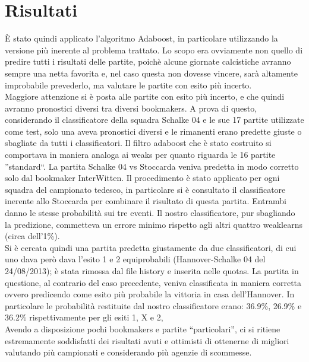 \section{Risultati}

\`E stato quindi applicato l'algoritmo Adaboost, in particolare utilizzando la versione pi\`u inerente al problema trattato.
Lo scopo era ovviamente non quello di predire tutti i risultati delle partite, poich\`e alcune giornate calcistiche avranno sempre una
netta favorita e, nel caso questa non dovesse vincere, sar\`a altamente improbabile prevederlo, 
ma valutare le partite con esito pi\`u incerto.\\
 Maggiore attenzione si \`e posta alle partite con esito pi\`u incerto, e che quindi avranno pronostici diversi tra diversi bookmakers.
 A prova di questo, considerando il classificatore della squadra Schalke 04
 e le sue 17 partite utilizzate come test, solo una aveva pronostici diversi e le rimanenti erano predette giuste o sbagliate da tutti
i classificatori. Il filtro adaboost che \`e stato costruito si comportava in maniera analoga ai weaks per quanto riguarda le 16 partite ''standard``.
La partita Schalke 04 vs Stoccarda veniva predetta in modo corretto solo dal bookmaker InterWitten.
Il procedimento \`e stato applicato per ogni squadra del campionato tedesco, in particolare si \`e consultato 
il classificatore inerente allo Stoccarda per combinare il risultato di questa partita. Entrambi danno le stesse probabilit\`a sui tre eventi.
Il nostro classificatore, pur sbagliando la predizione,
commetteva un errore minimo rispetto agli altri quattro weaklearns (circa dell'1\%).\\
\newline
Si \`e cercata quindi una partita predetta giustamente da due classificatori, di cui uno dava per\`o dava l'esito 1 e 2 equiprobabili (Hannover-Schalke 04 del 24/08/2013); \`e stata rimossa dal file history e inserita nelle quotas.
La partita in questione, al contrario del caso precedente, veniva classificata in maniera corretta ovvero predicendo come esito pi\`u probabile la vittoria in casa dell'Hannover.
In particolare le probabilit\`a restituite dal nostro classificatore erano: 36.9\%, 26.9\% e 36.2\% rispettivamente per gli esiti 1, X e 2, 
\\
\newline
Avendo a disposizione pochi bookmakers e partite ``particolari'', ci si ritiene estremamente soddisfatti 
dei risultati avuti e ottimisti di ottenerne di migliori valutando pi\`u campionati 
e considerando pi\`u agenzie di scommesse.







